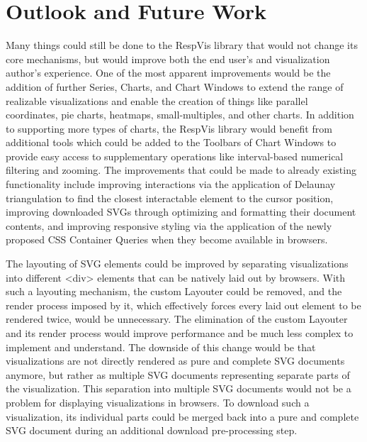\chapter{Outlook and Future Work}
\label{chap:Outlook}

Many things could still be done to the RespVis library that would not
change its core mechanisms, but would improve both the end user's and
visualization author's experience. One of the most apparent
improvements would be the addition of further Series, Charts, and
Chart Windows to extend the range of realizable visualizations and
enable the creation of things like parallel coordinates, pie charts,
heatmaps, small-multiples, and other charts. In addition to supporting
more types of charts, the RespVis library would benefit from
additional tools which could be added to the Toolbars of Chart Windows
to provide easy access to supplementary operations like interval-based
numerical filtering and zooming. The improvements that could be made
to already existing functionality include improving interactions via
the application of Delaunay triangulation
\parencite{Delaunay,DelaunayAlgorithms} to find the closest
interactable element to the cursor position, improving downloaded SVGs
through optimizing and formatting their document contents, and
improving responsive styling via the application of the newly proposed
CSS Container Queries \parencite{CSSContainment3} when they become
available in browsers.

The layouting of SVG elements could be improved by separating
visualizations into different <div> elements that can be natively laid
out by browsers. With such a layouting mechanism, the custom Layouter
could be removed, and the render process imposed by it, which
effectively forces every laid out element to be rendered twice, would
be unnecessary. The elimination of the custom Layouter and its render
process would improve performance and be much less complex to
implement and understand. The downside of this change would be that
visualizations are not directly rendered as pure and complete SVG
documents anymore, but rather as multiple SVG documents representing
separate parts of the visualization. This separation into multiple SVG
documents would not be a problem for displaying visualizations in
browsers. To download such a visualization, its individual parts could
be merged back into a pure and complete SVG document during an
additional download pre-processing step.

